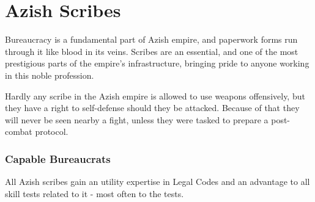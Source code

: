 \section{Azish Scribes}
\label{enemyFractionScribes}

Bureaucracy is a fundamental part of Azish empire, and paperwork forms run through it like blood in its veins. Scribes are an essential, and one of the most prestigious parts of the empire's infrastructure, bringing pride to anyone working in this noble profession.

Hardly any scribe in the Azish empire is allowed to use weapons offensively, but they have a right to self-defense should they be attacked. Because of that they will never be seen nearby a fight, unless they were tasked to prepare a post-combat protocol. \\

	

\subsubsection{Capable Bureaucrats}

All Azish scribes gain an utility expertise in Legal Codes and an advantage to all skill tests related to it - most often to the \skillLore{} tests. \\



\newpage

\newpage

\newpage

\newpage
